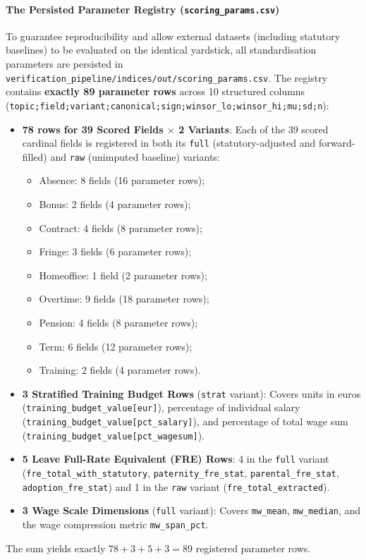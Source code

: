\paragraph{The Persisted Parameter Registry (\nolinkurl{scoring_params.csv})}
To guarantee reproducibility and allow external datasets (including statutory baselines) to be evaluated on the identical yardstick, all standardisation parameters are persisted in \nolinkurl{verification_pipeline/indices/out/scoring_params.csv}. The registry contains \textbf{exactly 89 parameter rows} across 10 structured columns (\nolinkurl{topic;field;variant;canonical;sign;winsor_lo;winsor_hi;mu;sd;n}):
\begin{itemize}[leftmargin=1.5em]
  \item \textbf{78 rows for 39 Scored Fields $\times$ 2 Variants}: Each of the 39 scored cardinal fields is registered in both its \nolinkurl{full} (statutory-adjusted and forward-filled) and \nolinkurl{raw} (unimputed baseline) variants:
    \begin{itemize}[leftmargin=1.0em]
      \item Absence: 8 fields (16 parameter rows);
      \item Bonus: 2 fields (4 parameter rows);
      \item Contract: 4 fields (8 parameter rows);
      \item Fringe: 3 fields (6 parameter rows);
      \item Homeoffice: 1 field (2 parameter rows);
      \item Overtime: 9 fields (18 parameter rows);
      \item Pension: 4 fields (8 parameter rows);
      \item Term: 6 fields (12 parameter rows);
      \item Training: 2 fields (4 parameter rows).
    \end{itemize}
  \item \textbf{3 Stratified Training Budget Rows} (\nolinkurl{strat} variant): Covers units in euros (\nolinkurl{training_budget_value[eur]}), percentage of individual salary (\nolinkurl{training_budget_value[pct_salary]}), and percentage of total wage sum (\nolinkurl{training_budget_value[pct_wagesum]}).
  \item \textbf{5 Leave Full-Rate Equivalent (FRE) Rows}: 4 in the \nolinkurl{full} variant (\nolinkurl{fre_total_with_statutory}, \nolinkurl{paternity_fre_stat}, \nolinkurl{parental_fre_stat}, \nolinkurl{adoption_fre_stat}) and 1 in the \nolinkurl{raw} variant (\nolinkurl{fre_total_extracted}).
  \item \textbf{3 Wage Scale Dimensions} (\nolinkurl{full} variant): Covers \nolinkurl{mw_mean}, \nolinkurl{mw_median}, and the wage compression metric \nolinkurl{mw_span_pct}.
\end{itemize}
The sum yields exactly $78 + 3 + 5 + 3 = 89$ registered parameter rows.

